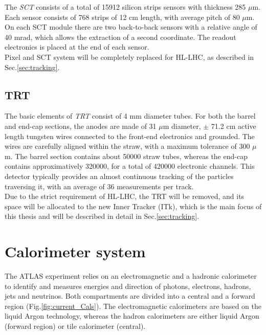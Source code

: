 \documentclass[a4paper,twoside,12pt]{book}
\begin{document}
The \textit{SCT} consists of a total of 15912 silicon strips sensors with thickness 285 $\mu$m. Each sensor consists of 768 strips of 12 cm length, with average pitch of 80 $\mu$m.
On each SCT module there are two back-to-back sensors with a relative angle of 40 mrad,
which allows the extraction of a second coordinate. The readout electronics is placed at the end of each sensor.\\

Pixel and SCT system will be completely replaced for HL-LHC, as described in Sec.\ref{sec:tracking}.

\subsection*{TRT}
The basic elements of \textit{TRT} consist of 4 mm diameter tubes\cite{Aad:2008zzm}. For both the barrel
and end-cap sections, the anodes are made of 31 $\mu$m diameter, $\pm$ 71.2 cm 
active length tungsten wires 
connected to the front-end electronics and grounded. The wires are carefully aligned within
the straw, with a maximum tolerance of 300 $\mu$m. The barrel section contains about 
50000 straw tubes, whereas the end-cap contains approximatively 320000,
for a total of 420000 electronic channels\cite{ATLAS:1997ag}. This detector typically provides
an almost continuous tracking of the particles traversing it, with an average of 36 measurements per track.\\

Due to the strict requirement of HL-LHC, the TRT will be removed, and its space will be allocated to the new
Inner Tracker (ITk), which is the main focus of this thesis and will be described in detail in Sec.\ref{sec:tracking}.

\section{Calorimeter system}

The ATLAS experiment  relies on an electromagnetic and a hadronic calorimeter to identify and measures energies and direction of photons, electrons, hadrons, jets and neutrinos. 
Both compartments are divided into a central and a forward region (Fig.\ref{fig:current_Cals}). The electromagnetic calorimeters are based on the liquid Argon technology,
whereas the hadron calorimeters are either liquid Argon (forward region) or tile calorimeter (central).\\
\end{document}
